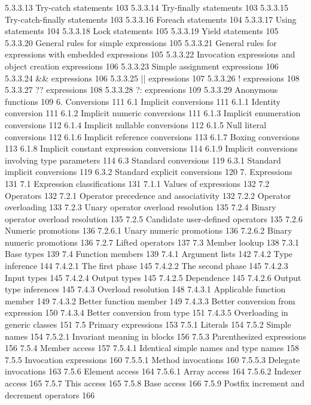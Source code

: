 5.3.3.13 Try-catch statements	103
5.3.3.14 Try-finally statements	103
5.3.3.15 Try-catch-finally statements	103
5.3.3.16 Foreach statements	104
5.3.3.17 Using statements	104
5.3.3.18 Lock statements	105
5.3.3.19 Yield statements	105
5.3.3.20 General rules for simple expressions	105
5.3.3.21 General rules for expressions with embedded expressions	105
5.3.3.22 Invocation expressions and object creation expressions	106
5.3.3.23 Simple assignment expressions	106
5.3.3.24 && expressions	106
5.3.3.25 || expressions	107
5.3.3.26 ! expressions	108
5.3.3.27 ?? expressions	108
5.3.3.28 ?: expressions	109
5.3.3.29 Anonymous functions	109
6. Conversions	111
6.1 Implicit conversions	111
6.1.1 Identity conversion	111
6.1.2 Implicit numeric conversions	111
6.1.3 Implicit enumeration conversions	112
6.1.4 Implicit nullable conversions	112
6.1.5 Null literal conversions	112
6.1.6 Implicit reference conversions	113
6.1.7 Boxing conversions	113
6.1.8 Implicit constant expression conversions	114
6.1.9 Implicit conversions involving type parameters	114
6.3 Standard conversions	119
6.3.1 Standard implicit conversions	119
6.3.2 Standard explicit conversions	120
7. Expressions	131
7.1 Expression classifications	131
7.1.1 Values of expressions	132
7.2 Operators	132
7.2.1 Operator precedence and associativity	132
7.2.2 Operator overloading	133
7.2.3 Unary operator overload resolution	135
7.2.4 Binary operator overload resolution	135
7.2.5 Candidate user-defined operators	135
7.2.6 Numeric promotions	136
7.2.6.1 Unary numeric promotions	136
7.2.6.2 Binary numeric promotions	136
7.2.7 Lifted operators	137
7.3 Member lookup	138
7.3.1 Base types	139
7.4 Function members	139
7.4.1 Argument lists	142
7.4.2 Type inference	144
7.4.2.1 The first phase	145
7.4.2.2 The second phase	145
7.4.2.3 Input types	145
7.4.2.4 Output types	145
7.4.2.5 Dependence	145
7.4.2.6 Output type inferences	145
7.4.3 Overload resolution	148
7.4.3.1 Applicable function member	149
7.4.3.2 Better function member	149
7.4.3.3 Better conversion from expression	150
7.4.3.4 Better conversion from type	151
7.4.3.5 Overloading in generic classes	151
7.5 Primary expressions	153
7.5.1 Literals	154
7.5.2 Simple names	154
7.5.2.1 Invariant meaning in blocks	156
7.5.3 Parenthesized expressions	156
7.5.4 Member access	157
7.5.4.1 Identical simple names and type names	158
7.5.5 Invocation expressions	160
7.5.5.1 Method invocations	160
7.5.5.3 Delegate invocations	163
7.5.6 Element access	164
7.5.6.1 Array access	164
7.5.6.2 Indexer access	165
7.5.7 This access	165
7.5.8 Base access	166
7.5.9 Postfix increment and decrement operators	166
